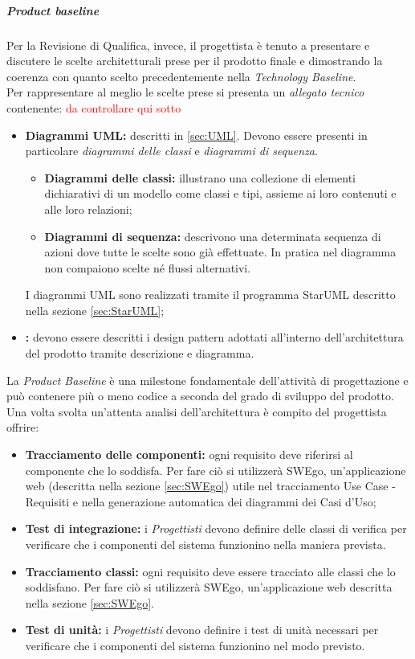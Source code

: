 			\subparagraph{Product baseline}
			\label{sec:prod}
			\Spazio
			Per la Revisione di Qualifica, invece, il progettista è tenuto a presentare e discutere le scelte architetturali prese per il prodotto finale e dimostrando la coerenza con quanto scelto precedentemente nella \textit{Technology Baseline}.\\
			Per rappresentare al meglio le scelte prese si presenta un \emph{allegato tecnico} contenente:
			\textcolor{red}{da controllare qui sotto}
				\begin{itemize}
					\item \textbf{Diagrammi UML:} descritti in \ref{sec:UML}. Devono essere presenti in particolare \emph{diagrammi delle classi} e \emph{diagrammi di sequenza}.
					\begin{itemize}
						\item \textbf{Diagrammi delle classi:} illustrano una collezione di elementi dichiarativi di un modello come classi e tipi, assieme ai loro contenuti e alle loro relazioni;
						\item \textbf{Diagrammi di sequenza:} descrivono una determinata sequenza di azioni dove tutte le scelte sono già effettuate. In pratica nel diagramma non compaiono scelte né flussi alternativi.
					\end{itemize}
					I diagrammi UML sono realizzati tramite il programma StarUML descritto nella sezione \ref{sec:StarUML};
					\item \textbf{:}
					devono essere descritti i design pattern adottati all'interno dell'architettura del prodotto tramite descrizione e diagramma.
				\end{itemize}
		   La \textit{Product Baseline} è una milestone fondamentale dell'attività di progettazione e può contenere più o meno codice a seconda del grado di sviluppo del prodotto.\\
		   
		   Una volta svolta un'attenta analisi dell'architettura è compito del progettista offrire:
		   \begin{itemize}
		   	\item \textbf{Tracciamento delle componenti:}
		   	ogni requisito deve riferirsi al componente che lo soddisfa. Per fare ciò si utilizzerà SWEgo, un'applicazione web (descritta nella sezione \ref{sec:SWEgo}) utile nel tracciamento Use Case - Requisiti e nella generazione automatica dei diagrammi dei Casi d'Uso;
		   	\item \textbf{Test di integrazione:}
		   	i \emph{Progettisti} devono definire delle classi di verifica per verificare che i componenti del sistema funzionino nella maniera prevista.	
		   	\item \textbf{Tracciamento classi:}
		   	ogni requisito deve essere tracciato alle classi che lo soddisfano. Per fare ciò si utilizzerà SWEgo, un'applicazione web descritta nella sezione \ref{sec:SWEgo}.
		   	\item \textbf{Test di unità:}
		   	i \emph{Progettisti} devono definire i test di unità necessari per verificare che i componenti del sistema funzionino nel modo previsto.
		   \end{itemize}
		
